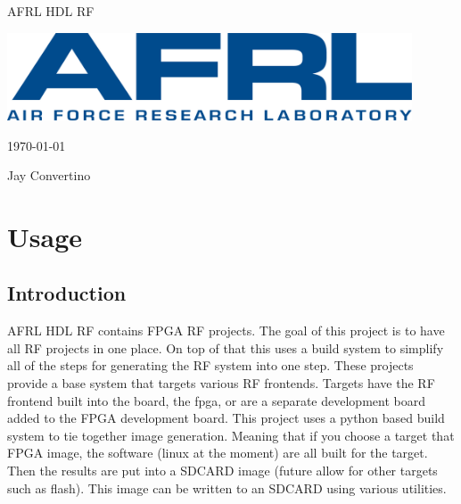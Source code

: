 \begin{titlepage}
  \begin{center}

  {\Huge AFRL HDL RF}

  \vspace{25mm}

  \includegraphics[width=0.90\textwidth,height=\textheight,keepaspectratio]{img/AFRL.png}

  \vspace{25mm}

  \today

  \vspace{15mm}

  {\Large Jay Convertino}

  \end{center}
\end{titlepage}

\tableofcontents

\newpage

\section{Usage}

\subsection{Introduction}

\par
AFRL HDL RF contains FPGA RF projects. The goal of this project is to have all RF projects in one place. On top of that this uses a build system
to simplify all of the steps for generating the RF system into one step. These projects provide a base system that targets various RF frontends.
Targets have the RF frontend built into the board, the fpga, or are a separate development board added to the FPGA development board.
This project uses a python based build system to tie together image generation. Meaning that if you choose a target that FPGA image,
the software (linux at the moment) are all built for the target. Then the results are put into a SDCARD image (future allow for other targets such as flash).
This image can be written to an SDCARD using various utilities.

